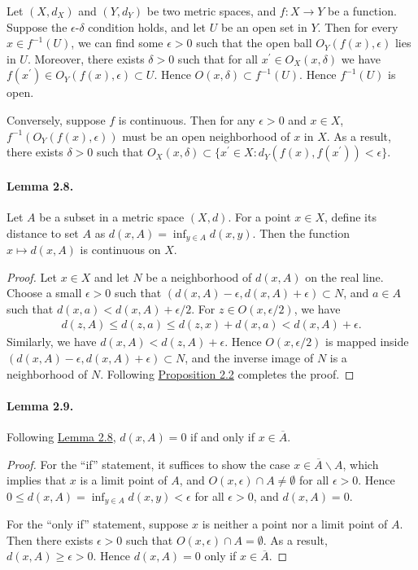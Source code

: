 \documentclass{article}
\numberwithin{equation}{section}
\theoremstyle{plain}
\theoremstyle{definition}
\begin{document}
Let $(X,d_X)$ and $(Y,d_Y)$ be two metric spaces, and $f:X\to Y$ be a function. Suppose the $\epsilon$-$\delta$ condition holds, and let $U$ be an open set in $Y$. Then for every $x\in f^{-1}(U)$, we can find some $\epsilon > 0$ such that the open ball $O_Y(f(x),\epsilon)$ lies in $U$. Moreover, there exists $\delta > 0$ such that for all $x^\prime\in O_X(x,\delta)$ we have $f(x^\prime)\in O_Y(f(x),\epsilon)\subset U$. Hence $O(x,\delta)\subset f^{-1}(U)$. Hence $f^{-1}(U)$ is open.

Conversely, suppose $f$ is continuous. Then for any $\epsilon > 0$ and $x\in X$, $f^{-1}\left(O_Y(f(x),\epsilon)\right)$ must be an open neighborhood of $x$ in $X$. As a result, there exists $\delta > 0$ such that $O_X(x,\delta)\subset\{x^\prime\in X:d_Y(f(x),f(x^\prime))<\epsilon\}$.

\paragraph{Lemma 2.8.\label{lemma:2.8}} Let $A$ be a subset in a metric space $(X,d)$. For a point $x\in X$, define its distance to set $A$ as $d(x,A) = \inf_{y\in A}d(x,y)$. Then the function $x\mapsto d(x,A)$ is continuous on $X$.
\begin{proof}
Let $x\in X$ and let $N$ be a neighborhood of $d(x,A)$ on the real line. Choose a small $\epsilon > 0$ such that $(d(x,A)-\epsilon,d(x,A)+\epsilon)\subset N$, and $a\in A$ such that $d(x,a)<d(x,A) + \epsilon/2$. For $z\in O(x,\epsilon/2)$, we have
\begin{align*}
	d(z,A) \leq d(z,a) \leq d(z,x) + d(x,a) < d(x,A) + \epsilon.
\end{align*}
Similarly, we have $d(x,A) < d(z,A) + \epsilon$. Hence $O(x,\epsilon/2)$ is mapped inside $(d(x,A)-\epsilon,d(x,A)+\epsilon)\subset N$, and the inverse image of $N$ is a neighborhood of $N$. Following \hyperref[prop:2.2]{Proposition 2.2} completes the proof.
\end{proof}

\paragraph{Lemma 2.9.\label{lemma:2.9}} Following \hyperref[lemma:2.8]{Lemma 2.8}, $d(x,A)=0$ if and only if $x\in\overline{A}$.
\begin{proof}
For the ``if'' statement, it suffices to show the case $x\in\overline{A}\backslash A$, which implies that $x$ is a limit point of $A$, and $O(x,\epsilon)\cap A\neq\emptyset$ for all $\epsilon > 0$. Hence $0\leq d(x,A) = \inf_{y\in A}d(x,y) <\epsilon$ for all $\epsilon > 0$, and $d(x,A) = 0$.

For the ``only if'' statement, suppose $x$ is neither a point nor a limit point of $A$. Then there exists $\epsilon > 0$ such that $O(x,\epsilon)\cap A = \emptyset$. As a result, $d(x,A) \geq \epsilon > 0$. Hence $d(x,A)=0$ only if $x\in\overline{A}$. 
\end{proof}
\end{document}
